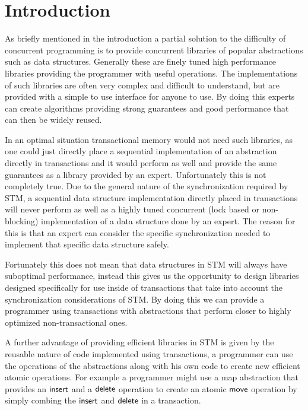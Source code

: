 \section{Introduction}

As briefly mentioned in the introduction a partial solution to the difficulty of concurrent programming
is to provide concurrent libraries of popular abstractions such as data structures.
Generally these are finely tuned high performance libraries
providing the programmer with useful operations.
The implementations of such libraries are often very complex
and difficult to understand, but are provided with a simple to use
interface for anyone to use.
By doing this experts can create algorithms providing strong guarantees
and good performance that can then be widely reused.

In an optimal situation transactional memory would not need such libraries,
as one could just directly place a sequential implementation of an abstraction
directly in transactions and it would perform as well and provide the same
guarantees as a library provided by an expert.
Unfortunately this is not completely true.
Due to the general nature
of the synchronization required by STM, a sequential data structure implementation directly
placed in transactions will never perform as well as a highly tuned concurrent
(lock based or non-blocking) implementation of a data structure done by an expert.
The reason for this is that an expert can consider the specific synchronization needed to implement
that specific data structure safely.

Fortunately this does not mean that data structures in STM will always have suboptimal performance,
instead this gives us the opportunity to design libraries designed specifically for use inside
of transactions that take into account the synchronization considerations
of STM.
By doing this we can provide a programmer using transactions with abstractions that perform closer
to highly optimized non-transactional ones.

A further advantage of providing efficient libraries in STM is given by the reusable nature of code implemented using
transactions, a programmer can use the operations of the abstractions along with his own code
to create new efficient atomic operations.
For example a programmer might use a map abstraction that provides an $\lit{insert}$ and a $\lit{delete}$ operation
to create an atomic $\lit{move}$ operation by simply combing the $\lit{insert}$ and $\lit{delete}$ in a transaction.

